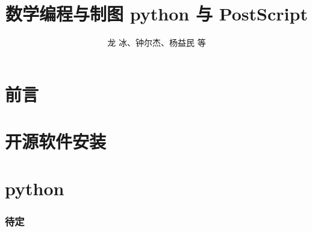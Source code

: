 \documentclass[zihao=-4,linespread=1.5,heading=true,a4paper,twoside]{ctexart}
\title{数学编程与制图 python 与 PostScript}
\author{龙 冰、钟尔杰、杨益民 等}
\begin{document}
\begin{titlepage}
	\maketitle
\end{titlepage}

\part*{前言}\label{sec:preface}


\newpage\tableofcontents

\newpage\part{开源软件安装}


\newpage\part{python}
\section{待定}\label{sec:II.1}


%

%

%

%
\end{document}
